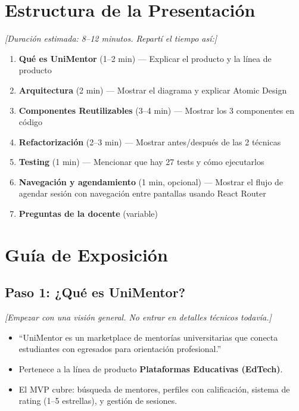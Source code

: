 \documentclass[12pt, a4paper]{article}
\newcommand{\nota}[1]{%
  \textcolor{upds-gold}{\small\textit{[#1]}}%
}
\begin{document}
\section{Estructura de la Presentación}

\nota{Duración estimada: 8--12 minutos. Repartí el tiempo así:}

\begin{enumerate}
  \item \textbf{Qué es UniMentor} (1--2 min) --- Explicar el producto y la línea de producto
  \item \textbf{Arquitectura} (2 min) --- Mostrar el diagrama y explicar Atomic Design
  \item \textbf{Componentes Reutilizables} (3--4 min) --- Mostrar los 3 componentes en código
  \item \textbf{Refactorización} (2--3 min) --- Mostrar antes/después de las 2 técnicas
  \item \textbf{Testing} (1 min) --- Mencionar que hay 27 tests y cómo ejecutarlos
  \item \textbf{Navegación y agendamiento} (1 min, opcional) --- Mostrar el flujo de agendar sesión con navegación entre pantallas usando React Router
  \item \textbf{Preguntas de la docente} (variable)
\end{enumerate}

\section{Guía de Exposición}

\subsection{Paso 1: ¿Qué es UniMentor?}
\nota{Empezar con una visión general. No entrar en detalles técnicos todavía.}

\begin{itemize}
  \item ``UniMentor es un marketplace de mentorías universitarias que conecta estudiantes con egresados para orientación profesional.''
  \item Pertenece a la línea de producto \textbf{Plataformas Educativas (EdTech)}.
  \item El MVP cubre: búsqueda de mentores, perfiles con calificación, sistema de rating (1--5 estrellas), y gestión de sesiones.
\end{itemize}
\end{document}
